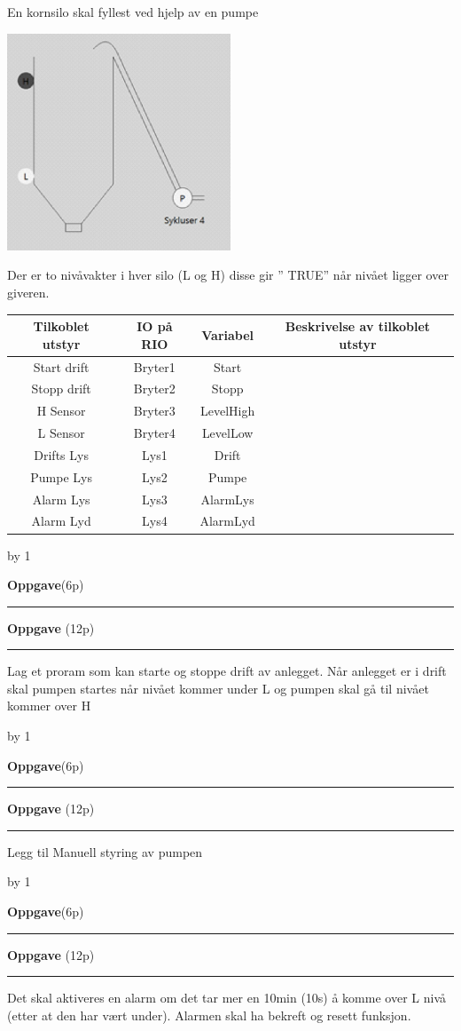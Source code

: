 \documentclass[12pt,a4paper]{article}
\def\oppgave{
            \advance\questnum by 1
	    \ifthenelse{\questnum>0\AND \questnum<9}
	    {
                \vskip 1cm
		\textbf{Oppgave}\hskip 5pt\the\questnum \hfill \hfill(6p)
		\vskip 3pt
		\hrule
	\vskip 0.5cm}
	{
                \vskip 1cm
		\textbf{Oppgave}\hskip 5pt \the\questnum \hfill \hfill(12p)
		\vskip 3pt \hrule \vskip 0.5cm }

		}
\begin{document}
En kornsilo skal fyllest ved hjelp av en pumpe
\begin{center}
\includegraphics[width=0.5\textwidth]{i08012x01.png}
\end{center}
Der er to nivåvakter i hver silo (L og H) disse gir \textquotedblright{}
TRUE\textquotedblright{} når nivået ligger over giveren.

\vskip 10pt 
\begin{tabular}{|c|c|c|c|}
\hline 
Tilkoblet utstyr & IO på RIO & Variabel & Beskrivelse av tilkoblet utstyr\tabularnewline
\hline 
\hline 
Start drift & Bryter1 & Start & \tabularnewline
\hline 
Stopp drift & Bryter2 & Stopp & \tabularnewline
\hline 
H Sensor & Bryter3 & LevelHigh & \tabularnewline
\hline 
L Sensor & Bryter4 & LevelLow & \tabularnewline
\hline 
Drifts Lys & Lys1 & Drift & \tabularnewline
\hline 
Pumpe Lys & Lys2 & Pumpe & \tabularnewline
\hline 
Alarm Lys & Lys3 & AlarmLys & \tabularnewline
\hline 
Alarm Lyd & Lys4 & AlarmLyd & \tabularnewline
\hline 
\end{tabular}

\oppgave{}
Lag et proram som kan starte og stoppe drift av anlegget. Når anlegget er i drift skal pumpen startes når nivået kommer under L og pumpen skal gå til nivået kommer over H
\oppgave{}
Legg til Manuell styring av pumpen
\oppgave{}
Det skal aktiveres en alarm om det tar mer en 10min (10s) å komme over L nivå (etter at den har vært under). Alarmen skal ha bekreft og resett funksjon.
\end{document}

